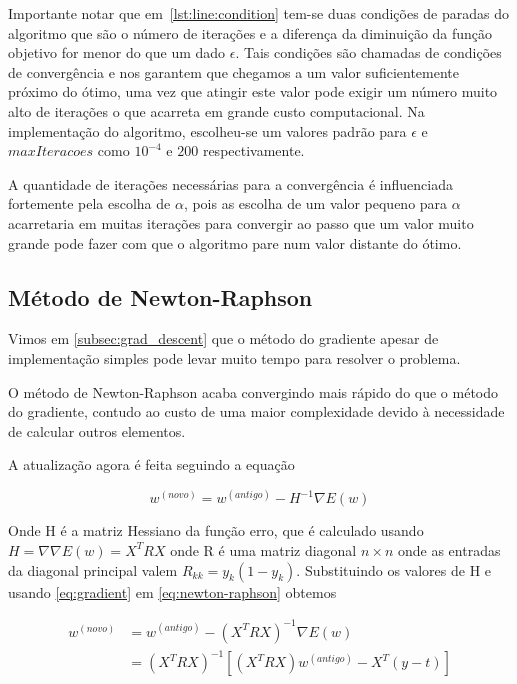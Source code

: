 Importante notar que em~\ref{lst:line:condition} tem-se duas condições de paradas do algoritmo que
são o número de iterações e a diferença da diminuição da função objetivo for menor do que
um dado $\epsilon$. Tais condições são chamadas de condições de convergência e nos garantem
que chegamos a um valor suficientemente próximo do ótimo, uma vez que atingir este valor
pode exigir um número muito alto de iterações o que acarreta em grande custo computacional.
 Na implementação do algoritmo, escolheu-se um valores
padrão para $\epsilon$ e $maxIteracoes$ como $10^{-4}$ e $200$ respectivamente.

A quantidade de iterações necessárias para a convergência é influenciada fortemente pela
escolha de $\alpha$, pois as escolha de um valor pequeno para $\alpha$ acarretaria
em muitas iterações para convergir ao passo que um valor muito grande pode fazer
com que o algoritmo pare num valor distante do ótimo.


\subsection{Método de Newton-Raphson}
\label{subsec:newton-raphson}

Vimos em \ref{subsec:grad_descent} que o método do gradiente apesar de implementação
simples pode levar muito tempo para resolver o problema.

O método de Newton-Raphson acaba convergindo mais rápido do que o método do gradiente,
contudo ao custo de uma maior complexidade devido à necessidade de calcular outros
elementos.

A atualização agora é feita seguindo a equação

\begin{center}
	\begin{equation}\label{eq:newton-raphson}
		w^{ (novo) } = w^{ (antigo) } - H^{-1} \nabla E(w)
	\end{equation}
\end{center}

Onde H é a matriz Hessiano da função erro, que é calculado usando $H = \nabla \nabla E(w)
= X^TRX$ onde R é uma matriz diagonal $n \times n$ onde as entradas da diagonal principal
valem $R_{kk} = y_k(1 - y_k)$. Substituindo os valores de H e usando
\ref{eq:gradient} em \ref{eq:newton-raphson} obtemos


\begin{equation}
\begin{split}
w^{ (novo) } & = w^{ (antigo) } - (X^T R X)^{-1} \nabla E(w) \\
	& = (X^T R X)^{-1}[(X^T R X)w^{ (antigo) } - X^T(y - t)]  
\end{split}
\end{equation}

